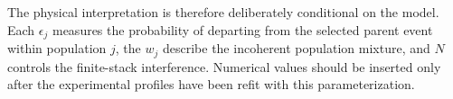 The physical interpretation is therefore deliberately conditional on the
model.  Each $\epsilon_j$ measures the probability of departing from the
selected parent event within population $j$, the $w_j$ describe the incoherent
population mixture, and $N$ controls the finite-stack interference.  Numerical
values should be inserted only after the experimental profiles have been
refit with this parameterization.
